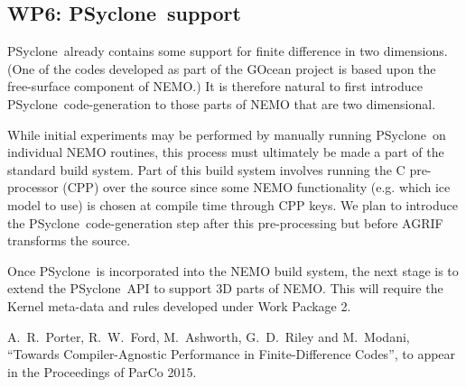 \documentclass{article}
\newcommand{\psyclone}{{PS}yclone}
\begin{document}
\subsection{WP6: \psyclone\ support}
\label{wp6_autogen}

\psyclone\ already contains some support for finite difference in two
dimensions.  (One of the codes developed as part of the GOcean project
is based upon the free-surface component of NEMO.) It is therefore
natural to first introduce \psyclone\ code-generation to those parts of NEMO
that are two dimensional.

While initial experiments may be performed by manually running
\psyclone\ on individual NEMO routines, this process must ultimately be
made a part of the standard build system. Part of this build system
involves running the C pre-processor (CPP) over the source since some
NEMO functionality (e.g. which ice model to use) is chosen at compile
time through CPP keys. We plan to introduce the \psyclone\
code-generation step after this pre-processing but before AGRIF
transforms the source.

Once \psyclone\ is incorporated into the NEMO build system, the next
stage is to extend the \psyclone\ API to support 3D parts of NEMO.  This
will require the Kernel meta-data and rules developed under Work
Package 2.

\begin{thebibliography}{1}

 A.~R.~Porter, R.~W.~Ford, M.~Ashworth, G.~D.~Riley and M.~Modani, ``Towards Compiler-Agnostic Performance in Finite-Difference Codes'', to appear in the Proceedings of ParCo 2015.

\end{thebibliography}
\end{document}
